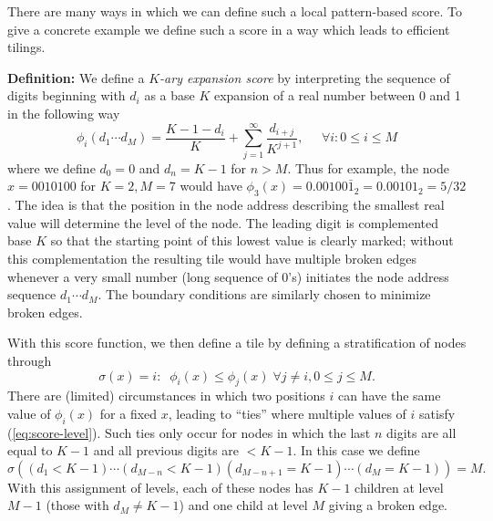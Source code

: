 \documentclass[12pt]{article}
\begin{document}
There are many ways in which we can define such a local pattern-based
score.  To give a concrete example we define such a score in a way
which leads to efficient tilings.

\vspace*{0.1in}

\noindent
{\bf Definition:} We define a {\it $K$-ary expansion
score} by interpreting the sequence
of digits beginning with $d_{i}$ as a base $K$ expansion of a  real number
between 0 and 1 in the following way
\begin{equation}
\phi_i(d_1 \cdots d_M) =
\frac{K-1-d_{i}}{K}  + \sum_{j = 1}^{\infty}  \frac{d_{i + j}}{K^{j
    + 1}}, \;\;\;\;\; \forall i: 0 \leq i \leq M
\label{eq:phi-score}
\end{equation}
where we define $d_0 = 0$  and $d_n = K -1$ for
$n > M$.  Thus for example, the node $x =0010100$ for $K = 2, M =  7$
would have $\phi_3 (x)= 0.00100\bar{1}_2 = 0.00101_2 = 5/32$.  The idea
is that the position in the node address describing the smallest
real value will determine the level of the node.
The leading digit is complemented base $K$ so that the starting point of this
lowest value is clearly marked; without this complementation the
resulting tile would have multiple broken edges whenever  a very small
number (long sequence of 0's) initiates the node address sequence $d_1
\cdots d_M$.  The boundary conditions are similarly chosen to minimize
broken edges.

With this score function, we then define a tile by defining a
stratification of nodes through
\begin{equation}
\sigma (x) = i:  \; \;
\phi_i (x) \leq \phi_j (x) \; \forall j \neq i, 0 \leq
j \leq M.
\label{eq:score-level}
\end{equation}
There are (limited)
circumstances in which two positions $i$
can have the same value of $\phi_i (x)$ for a fixed $x$, leading to
``ties'' where multiple values of $i$ satisfy (\ref{eq:score-level}).
Such ties only occur for nodes in which the last $n$ digits are all
equal to $K -1$ and all previous digits are $< K -1$.  In this case we define
\begin{equation}
\sigma ((d_1 < K -1) \cdots (d_{M-n} < K -1)
(d_{M-n + 1} = K -1) \cdots  (d_M = K -1)) =  M.
\label{eq:ties}
\end{equation}
With this assignment of levels, each of these nodes has $K -1$
children at level $M -1$ (those with $d_M\neq K -1$) and one child at
level  $M$
giving a broken edge.
\end{document}
